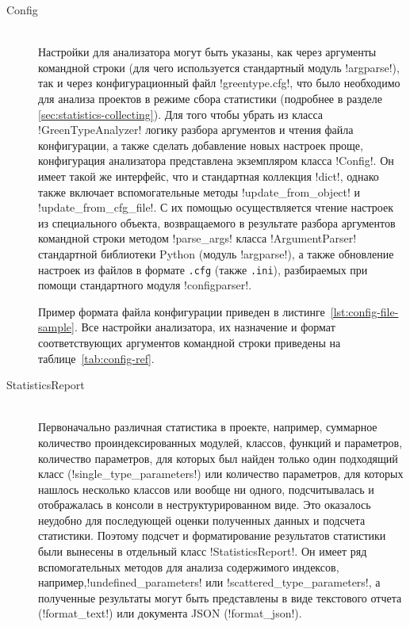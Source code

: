 \begin{description}
  \item[Config] \hfill \\
    Настройки для анализатора могут быть указаны, как через аргументы командной
    строки (для чего используется стандартный модуль !argparse!), так и через
    конфигурационный файл !greentype.cfg!, что было необходимо для анализа
    проектов в режиме сбора статистики (подробнее в разделе
    \ref{sec:statistics-collecting}). Для того чтобы убрать из класса
    !GreenTypeAnalyzer! логику разбора аргументов и чтения файла конфигурации, а
    также сделать добавление новых настроек проще, конфигурация анализатора
    представлена экземпляром класса !Config!. Он имеет такой же интерфейс, что и
    стандартная коллекция !dict!, однако также включает вспомогательные методы
    !update_from_object! и !update_from_cfg_file!. С их помощью осуществляется
    чтение настроек из специального объекта, возвращаемого в результате разбора
    аргументов командной строки методом !parse_args! класса
    !ArgumentParser! стандартной библиотеки Python (модуль !argparse!), а также
    обновление настроек из файлов в формате \texttt{.cfg} (также \texttt{.ini}),
    разбираемых при помощи стандартного модуля !configparser!.
    
    Пример формата файла конфигурации приведен в
    листинге~\ref{lst:config-file-sample}. Все настройки анализатора, их
    назначение и формат соответствующих аргументов командной строки приведены на
    таблице~\ref{tab:config-ref}.

  \item[StatisticsReport] \hfill \\
    Первоначально различная статистика в проекте, например, суммарное количество
    проиндексированных модулей, классов, функций и параметров, количество
    параметров, для которых был найден только один подходящий класс
    (!single_type_parameters!) или количество параметров, для которых нашлось
    несколько классов или вообще ни одного, подсчитывалась и отображалась в
    консоли в неструктурированном виде. Это оказалось неудобно для
    последующей оценки полученных данных и подсчета статистики. Поэтому подсчет
    и форматирование результатов статистики были вынесены в отдельный класс
    !StatisticsReport!. Он имеет ряд вспомогательных методов для анализа
    содержимого индексов, например,!undefined_parameters!  или
    !scattered_type_parameters!, а полученные результаты могут быть
    представлены в виде текстового отчета (!format_text!) или документа JSON
    (!format_json!). 

  
\end{description}

